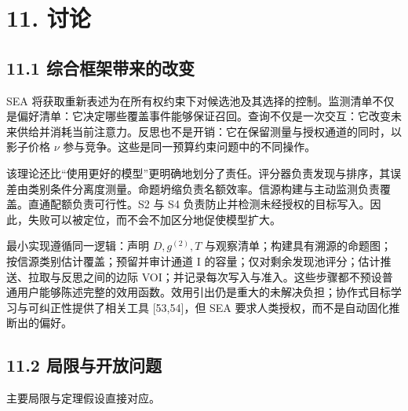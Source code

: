 \documentclass[
  chinese,
  11pt]{article}
\begin{document}
\section{11. 讨论}\label{ux8ba8ux8bba}

\subsection{11.1 综合框架带来的改变}\label{ux7efcux5408ux6846ux67b6ux5e26ux6765ux7684ux6539ux53d8}

SEA 将获取重新表述为在所有权约束下对候选池及其选择的控制。监测清单不仅是偏好清单：它决定哪些覆盖事件能够保证召回。查询不仅是一次交互：它改变未来供给并消耗当前注意力。反思也不是开销：它在保留测量与授权通道的同时，以影子价格 \(\nu\) 参与竞争。这些是同一预算约束问题中的不同操作。

该理论还比``使用更好的模型''更明确地划分了责任。评分器负责发现与排序，其误差由类别条件分离度测量。命题坍缩负责名额效率。信源构建与主动监测负责覆盖。直通配额负责可行性。S2 与 S4 负责防止并检测未经授权的目标写入。因此，失败可以被定位，而不会不加区分地促使模型扩大。

最小实现遵循同一逻辑：声明 \(D,g^{(2)},T\) 与观察清单；构建具有溯源的命题图；按信源类别估计覆盖；预留并审计通道 I 的容量；仅对剩余发现池评分；估计推送、拉取与反思之间的边际 VOI；并记录每次写入与准入。这些步骤都不预设普通用户能够陈述完整的效用函数。效用引出仍是重大的未解决负担；协作式目标学习与可纠正性提供了相关工具 {[}53,54{]}，但 SEA 要求人类授权，而不是自动固化推断出的偏好。

\subsection{11.2 局限与开放问题}\label{ux5c40ux9650ux4e0eux5f00ux653eux95eeux9898}

主要局限与定理假设直接对应。
\end{document}
